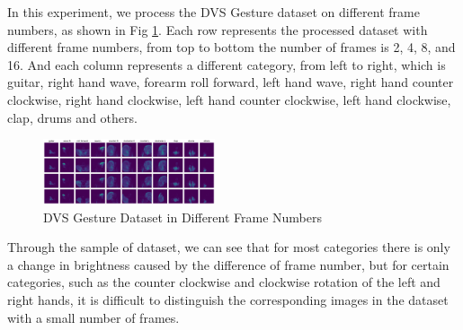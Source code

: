 \documentclass[conference]{IEEEtran}
\begin{document}
In this experiment, we process the DVS Gesture dataset on different frame numbers, as shown in Fig \ref{fig:dvs_gesture_frame_num}.
Each row represents the processed dataset with different frame numbers, from top to bottom the number of frames is 2, 4, 8, and 16.
And each column represents a different category, from left to right, which is guitar, right hand wave, forearm roll forward, left hand wave, 
right hand counter clockwise, right hand clockwise, left hand counter clockwise, left hand clockwise, clap, drums and others.
\begin{figure}
    \centering
    \includegraphics[width=0.45\textwidth]{figure/dataset.png}
    \caption{DVS Gesture Dataset in Different Frame Numbers}
    \label{fig:dvs_gesture_frame_num}
\end{figure}

Through the sample of dataset, we can see that for most categories there is only a change in brightness caused by the difference of frame number, 
but for certain categories, such as the counter clockwise and clockwise rotation of the left and right hands, 
it is difficult to distinguish the corresponding images in the dataset with a small number of frames.
\end{document}
